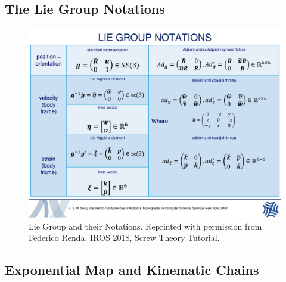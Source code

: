 \subsection{The Lie Group Notations}
\begin{figure}[tbph]
	\centering
	\includegraphics[width=\columnwidth]{figures/lienotations.pdf}
	\caption{Lie Group and their Notations. Reprinted with permission from Federico Renda. IROS 2018, Screw Theory Tutorial.}
	\label{fig:lienotations}
\end{figure}

\subsection{Exponential Map and Kinematic Chains}
\label{subsec:matexp}

